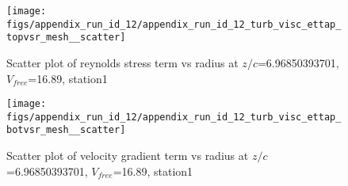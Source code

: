 \begin{figure}[H]
\centering
\texttt{[image: figs/appendix\_run\_id\_12/appendix\_run\_id\_12\_turb\_visc\_ettap\_topvsr\_mesh\_\_scatter]}
\caption{Scatter plot of reynolds stress term vs radius at $z/c$=6.96850393701, $V_{free}$=16.89, station1}
\label{fig:appendix_run_id_12_turb_visc_ettap_topvsr_mesh__scatter}
\end{figure}


\begin{figure}[H]
\centering
\texttt{[image: figs/appendix\_run\_id\_12/appendix\_run\_id\_12\_turb\_visc\_ettap\_botvsr\_mesh\_\_scatter]}
\caption{Scatter plot of velocity gradient term vs radius at $z/c$=6.96850393701, $V_{free}$=16.89, station1}
\label{fig:appendix_run_id_12_turb_visc_ettap_botvsr_mesh__scatter}
\end{figure}


